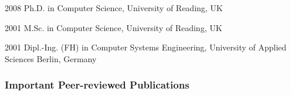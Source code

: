 \begin{compactitem}[0000]
  \item[2008] Ph.D. in Computer Science,
              University of Reading, UK
  \item[2001] M.Sc. in Computer Science,
              University of Reading, UK
  \item[2001] Dipl.-Ing. (FH) in Computer Systems Engineering,
              University of Applied Sciences Berlin, Germany
\end{compactitem}

\vspace*{-2ex}
\subsubsection*{Important Peer-reviewed Publications}
\vspace*{-1ex}

